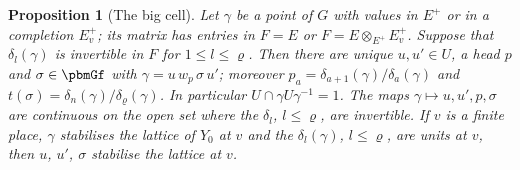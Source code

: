 \documentclass[10pt]{amsart}
\newtheorem{proposition}[theorem]{Proposition}
\theoremstyle{definition}
\theoremstyle{remark}
\begin{document}
\begin{proposition}[The big cell]\label{pbm:cell}
Let $\gamma$ be a point of $G$ with values in $E^+$ or in a completion $E^+_v$; its matrix has
entries in $F=E$ or $F=E\otimes_{E^+}E^+_v$. Suppose that $\delta_l(\gamma)$ is invertible in $F$ for
$1\le l\le\varrho$. Then there are unique $u,u'\in U$, a
head $p$ and $\sigma\in\pbmGf$ with $\gamma=u\,w_p\,\sigma\,u'$; moreover $p_a=\delta_{a+1}(\gamma)/
\delta_a(\gamma)$ and $t(\sigma)=\delta_n(\gamma)/\delta_\varrho(\gamma)$. In particular $U\cap\gamma
U\gamma^{-1}=1$. The maps $\gamma\mapsto u,u',p,\sigma$ are continuous on the open set where the
$\delta_l$, $l\le\varrho$, are invertible. If $v$ is a finite place, $\gamma$ stabilises the lattice
of $Y_0$ at $v$ and the $\delta_l(\gamma)$, $l\le\varrho$, are units at $v$, then $u$, $u'$,
$\sigma$ stabilise the lattice at $v$.
\end{proposition}
\end{document}
